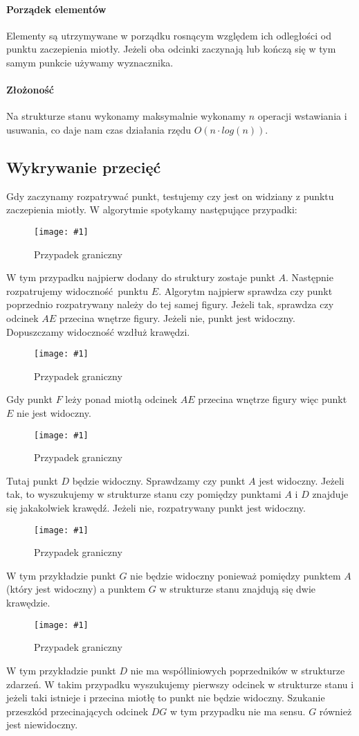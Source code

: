 \documentclass[12pt]{article}
\newcommand{\imgcustomsize}[3]{
	\begin{figure}[H]
		\centering
		\texttt{[image: \#1]}
		\caption{#2}
		\label{#1}
	\end{figure}
}
\newcommand{\img}[2]{\imgcustomsize{#1}{#2}{0.5}}
\begin{document}
			\paragraph{Porządek elementów}
				Elementy są utrzymywane w porządku rosnącym względem ich odległości od punktu zaczepienia miotły. Jeżeli oba odcinki zaczynają lub kończą się w tym samym punkcie używamy wyznacznika.
				
			\paragraph{Złożoność}
				Na strukturze stanu wykonamy maksymalnie wykonamy $ n $ operacji wstawiania i usuwania, co daje nam czas działania rzędu $ O(n \cdot log(n)) $.
		
		\subsection{Wykrywanie przecięć}
			Gdy zaczynamy rozpatrywać punkt, testujemy czy jest on widziany z punktu zaczepienia miotły.  W algorytmie spotykamy następujące przypadki:
			
			\img{przyp1.jpg}{Przypadek graniczny}
				W tym przypadku najpierw dodany do struktury zostaje punkt $ A $. Następnie rozpatrujemy widoczność punktu $ E $. Algorytm najpierw sprawdza czy punkt poprzednio rozpatrywany należy do tej samej figury. Jeżeli tak, sprawdza czy odcinek $ AE $ przecina wnętrze figury. Jeżeli nie, punkt jest widoczny. Dopuszczamy widoczność wzdłuż krawędzi.
				
			\img{przyp2.jpg}{Przypadek graniczny}
				Gdy punkt $ F $ leży ponad miotłą odcinek $ AE $ przecina wnętrze figury więc punkt $ E $ nie jest widoczny.
			
			\img{przyp3.jpg}{Przypadek graniczny}
				Tutaj punkt $ D $ będzie widoczny. Sprawdzamy czy punkt $ A $ jest widoczny. Jeżeli tak, to wyszukujemy w strukturze stanu czy pomiędzy punktami $ A $ i $ D $ znajduje się jakakolwiek krawędź. Jeżeli nie, rozpatrywany punkt jest widoczny.
				
			\img{przyp4.jpg}{Przypadek graniczny}
				W tym przykładzie punkt $ G $ nie będzie widoczny ponieważ pomiędzy punktem $ A $ (który jest widoczny) a punktem $ G $ w strukturze stanu znajdują się dwie krawędzie.
				
			\img{przyp5.jpg}{Przypadek graniczny}
				W tym przykładzie punkt $ D $ nie ma współliniowych poprzedników w strukturze zdarzeń. W takim przypadku wyszukujemy pierwszy odcinek w strukturze stanu i jeżeli taki istnieje i przecina miotłę to punkt nie będzie widoczny. Szukanie przeszkód przecinających odcinek $ DG $ w tym przypadku nie ma sensu. $ G $ również jest niewidoczny.
			
\end{document}
